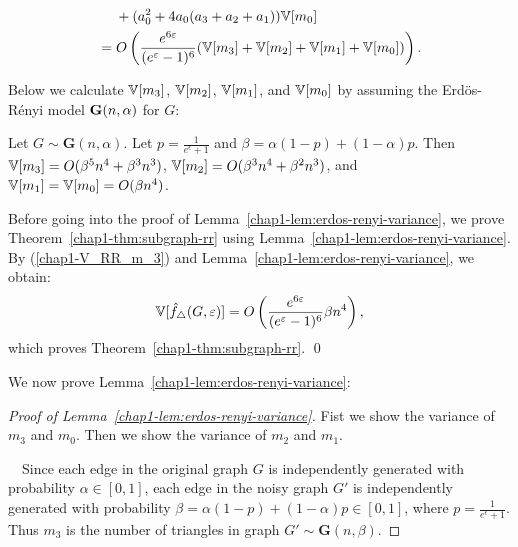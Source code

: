 {\begin{align}
    & \hspace{4.5mm} + (a_0^2 + 4a_0(a_3 + a_2 + a_1)) \mathbb{V}[m_0] \nonumber\\
    &= O\left( \frac{e^{6\varepsilon}}{(e^\varepsilon-1)^6} (\mathbb{V}[m_3] + \mathbb{V}[m_2] + \mathbb{V}[m_1] + \mathbb{V}[m_0]) \right).
    \label{chap1-V_RR_m_3}
\end{align}

Below we calculate $\mathbb{V}[m_3]$, $\mathbb{V}[m_2]$, $\mathbb{V}[m_1]$, and $\mathbb{V}[m_0]$ by assuming the Erd\"{o}s-R\'{e}nyi model $\mathbf{G}(n, \alpha)$ for $G$:

\begin{lemma}\label{chap1-lem:erdos-renyi-variance}
  Let $G \sim \textbf{G}(n,\alpha)$. 
  Let $p = \frac{1}{e^\epsilon+1}$ and 
  $\beta = \alpha(1-p) + (1-\alpha)p$. 
  Then $\mathbb{V}[m_3] = O(\beta^5 n^4 + \beta^3
  n^3)$, $\mathbb{V}[m_2] = O(\beta^3 n^4 + \beta^2 n^3)$, and 
  $\mathbb{V}[m_1] = \mathbb{V}[m_0] = O(\beta n^4)$.
\end{lemma}
Before going into the proof of Lemma~\ref{chap1-lem:erdos-renyi-variance}, we prove Theorem~\ref{chap1-thm:subgraph-rr} using Lemma~\ref{chap1-lem:erdos-renyi-variance}. 
By (\ref{chap1-V_RR_m_3}) and Lemma~\ref{chap1-lem:erdos-renyi-variance}, we obtain: 
\begin{align*}
\mathbb{V}[\hat{f}_{\triangle}(G, \varepsilon)] = O\left( \frac{e^{6\varepsilon}}{(e^\varepsilon-1)^6} \beta n^4 \right),
\end{align*}
which proves Theorem~\ref{chap1-thm:subgraph-rr}. \qed

We now prove Lemma~\ref{chap1-lem:erdos-renyi-variance}:

\begin{proof}[Proof of Lemma~\ref{chap1-lem:erdos-renyi-variance}]
Fist we show the variance of $m_3$ and $m_0$. 
Then we show the variance of $m_2$ and $m_1$.

\smallskip
{}~~Since each edge in the original graph $G$ is independently generated with probability $\alpha \in [0,1]$, each edge in the noisy graph $G'$ is independently generated with probability $\beta = \alpha (1-p) + (1 - \alpha) p \in [0,1]$, where $p=\frac{1}{e^\epsilon+1}$. 
Thus $m_3$ is the number of triangles in graph $G' \sim \textbf{G}(n,\beta)$.


\end{proof}}
